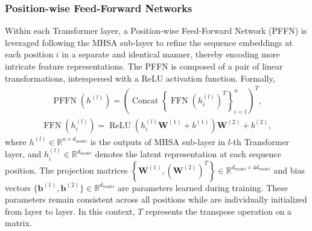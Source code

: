 \subsubsection{Position-wise Feed-Forward Networks}
Within each Transformer layer, a Position-wise Feed-Forward Network (PFFN) is leveraged following the MHSA sub-layer to refine the sequence embeddings at each position $i$ in a separate and identical manner, thereby encoding more intricate feature representations. 
The PFFN is composed of a pair of linear transformations, interspersed with a ReLU activation function. Formally,
\begin{equation}
\begin{aligned}
\operatorname{PFFN}(h^{(l)})=\left(\operatorname{Concat}\left\{\operatorname{FFN}(h^{(l)}_i)^T\right\}_{i=1}^{n}\right)^T,
\end{aligned}   
\end{equation}
\begin{equation}
\begin{aligned}
\operatorname{FFN}(h^{(l)}_i)=\operatorname{ReLU}(h^{(l)}_i\mathbf{W}^{(1)}+b^{(1)})\mathbf{W}^{(2)}+b^{(2)},
\end{aligned} 
\end{equation}
where $h^{(l)} \in \mathbb{R}^{n\times d_{model}}$ is the outputs of MHSA sub-layer in $l$-th Transformer layer, and $h^{(l)}_i \in \mathbb{R}^{d_{model}}$ denotes the latent representation at each sequence position. The projection matrices $\left\{\mathbf{W}^{(1)}, (\mathbf{W}^{(2)})^T \right\} \in \mathbb{R}^{d_{model} \times 4d_{model}}$ and bias vectors $\{\mathbf{b}^{(1)}, \mathbf{b}^{(2)}\} \in \mathbb{R}^{d_{model}}$ are parameters learned during training. These parameters remain consistent across all positions while are individually initialized from layer to layer. In this context, $T$ represents the transpose operation on a matrix.

